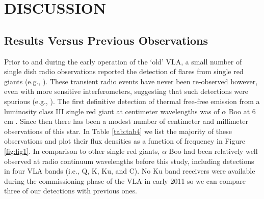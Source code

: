 \documentclass[iop]{emulateapj}
\begin{document}
\section{DISCUSSION} \label{disc:disc0}
\subsection{Results Versus Previous Observations} \label{disc1}
Prior to and during the early operation of the `old' VLA, a small number of single dish radio observations reported the detection of flares from single red giants (e.g., \citealt{1989MNRAS.239..913S}). These transient radio events have never been re-observed however, even with more sensitive interferometers, suggesting that such detections were spurious (e.g., \citealt{1992MNRAS.254....1B}). The first definitive detection of thermal free-free emission from a luminosity class III single red giant at centimeter wavelengths was of $\alpha$ Boo at 6 cm \citep{1983ApJ...274L..77D,1986AJ.....91..602D}. Since then there has been a modest number of centimeter and millimeter observations of this star. In Table \ref{tab:tab4} we list the majority of these observations and plot their flux densities as a function of frequency in Figure \ref{fig:fig1}. In comparison to other single red giants, $\alpha$ Boo had been relatively well observed at radio continuum wavelengths before this study, including detections in four VLA bands (i.e., Q, K, Ku, and C). No Ku band receivers were available during the commissioning phase of the VLA in early 2011 so we can compare three of our detections with previous ones. 
\end{document}
